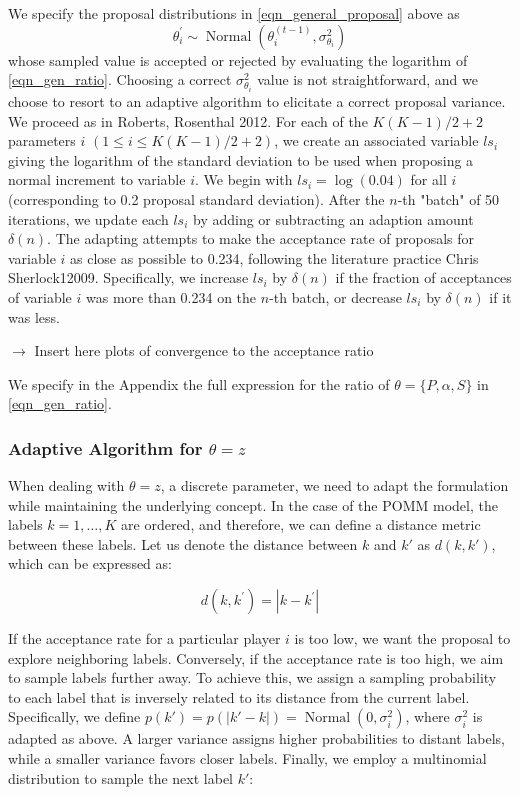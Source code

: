 \documentclass[11pt]{amsart}
\begin{document}
We specify the proposal distributions in \eqref{eqn_general_proposal} above as $$\theta_i^{\prime} \sim \operatorname{Normal}\left( \theta_i^{(t-1)}, \sigma_{\theta_i}^2 \right)$$ whose sampled value is accepted or rejected by evaluating the logarithm of \eqref{eqn_gen_ratio}. Choosing a correct $\sigma_{\theta_i}^2 $ value is not straightforward, and we choose to resort to an adaptive algorithm to elicitate a correct proposal variance. We proceed as in Roberts, Rosenthal 2012. For each of the $K(K-1)/2 + 2$ parameters \(i\) \((1 \leq i \leq K(K-1)/2 + 2)\), we create an associated variable \(ls_i\) giving the logarithm of the standard deviation to be used when proposing a normal increment to variable \(i\). We begin with \(ls_i = \log{(0.04)}\) for all \(i\) (corresponding to 0.2 proposal standard deviation). After the \(n\)-th "batch" of 50 iterations, we update each \(ls_i\) by adding or subtracting an adaption amount \(\delta(n)\). The adapting attempts to make the acceptance rate of proposals for variable \(i\) as close as possible to 0.234, following the literature practice Chris Sherlock12009. Specifically, we increase \(ls_i\) by \(\delta(n)\) if the fraction of acceptances of variable \(i\) was more than 0.234 on the \(n\)-th batch, or decrease \(ls_i\) by \(\delta(n)\) if it was less.

$\rightarrow$ Insert here plots of convergence to the acceptance ratio

We specify in the Appendix the full expression for the ratio of $\theta = \{ P, \alpha, S \}$ in \eqref{eqn_gen_ratio}.

\subsubsection{Adaptive Algorithm for $\theta = { z }$}

When dealing with $\theta = { z }$, a discrete parameter, we need to adapt the formulation while maintaining the underlying concept. In the case of the POMM model, the labels $k = 1, \ldots, K$ are ordered, and therefore, we can define a distance metric between these labels. Let us denote the distance between $k$ and $k'$ as $d(k, k')$, which can be expressed as:

\begin{equation}
d(k, k^\prime) = |k - k^\prime|
\end{equation}

If the acceptance rate for a particular player $i$ is too low, we want the proposal to explore neighboring labels. Conversely, if the acceptance rate is too high, we aim to sample labels further away. To achieve this, we assign a sampling probability to each label that is inversely related to its distance from the current label. Specifically, we define $p(k') = p(|k' - k|) = \operatorname{Normal}(0, \sigma_i^2)$, where $\sigma_i^2$ is adapted as above. A larger variance assigns higher probabilities to distant labels, while a smaller variance favors closer labels. Finally, we employ a multinomial distribution to sample the next label $k'$:
\end{document}

